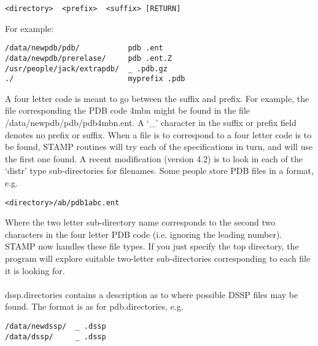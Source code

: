 \begin{scriptsize}\begin{verbatim}
<directory>  <prefix>  <suffix> [RETURN]
\end{verbatim} \end{scriptsize}

For example:\\

\begin{scriptsize}\begin{verbatim}
/data/newpdb/pdb/           pdb .ent
/data/newpdb/prerelase/     pdb .ent.Z
/usr/people/jack/extrapdb/  _ .pdb.gz
./                          myprefix .pdb
\end{verbatim} \end{scriptsize}

A four letter code is meant to go between the suffix and prefix.
For example, the file corresponding the PDB code 4mbn might be 
found in the file /data/newpdb/pdb/pdb4mbn.ent.  A `\_' character 
in the suffix or prefix field denotes no prefix or suffix.  When 
a file is to correspond to a four letter code is to be found, STAMP
routines will try each of the specifications in turn, and will use
the first one found.  A recent modification (version 4.2) is to look
in each of the `distr' type sub-directories for filenames.  Some people
store PDB files in a format, e.g.\\

\begin{scriptsize}\begin{verbatim}
<directory>/ab/pdb1abc.ent
\end{verbatim} \end{scriptsize}

Where the two letter sub-directory name corresponds to the second two characters
in the four letter PDB code (i.e. ignoring the leading number).  STAMP now
handles these file types.  If you just specify the top directory, the program
will explore suitable two-letter sub-directories corresponding to each file it
is looking for.\\
\\
dssp.directories contains a description as to where possible DSSP files
may be found.  The format is as for pdb.directories, e.g.\\

\begin{scriptsize}\begin{verbatim}
/data/newdssp/  _ .dssp
/data/dssp/     _ .dssp
\end{verbatim} \end{scriptsize}

